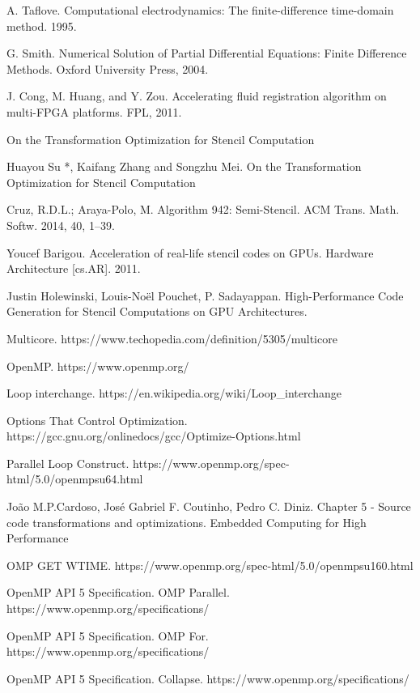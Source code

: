 \documentclass[conference]{IEEEtran}
\begin{document}
\begin{thebibliography}{1}

A. Taflove. Computational electrodynamics: The finite-difference time-domain method. 1995.

G. Smith. Numerical Solution of Partial Differential Equations: Finite Difference Methods. Oxford University Press, 2004.

J. Cong, M. Huang, and Y. Zou. Accelerating fluid registration algorithm on multi-FPGA platforms. FPL, 2011.

On the Transformation Optimization for Stencil Computation

Huayou Su *, Kaifang Zhang and Songzhu Mei. On the Transformation Optimization for Stencil Computation

Cruz, R.D.L.; Araya-Polo, M. Algorithm 942: Semi-Stencil. ACM Trans. Math. Softw. 2014, 40, 1–39.

Youcef Barigou. Acceleration of real-life stencil codes on GPUs. Hardware Architecture [cs.AR]. 2011.

Justin Holewinski, Louis-Noël Pouchet, P. Sadayappan. High-Performance Code Generation for Stencil Computations on GPU Architectures.

Multicore. https://www.techopedia.com/definition/5305/multicore

OpenMP. https://www.openmp.org/

Loop interchange. https://en.wikipedia.org/wiki/Loop_interchange

Options That Control Optimization. https://gcc.gnu.org/onlinedocs/gcc/Optimize-Options.html

Parallel Loop Construct. https://www.openmp.org/spec-html/5.0/openmpsu64.html

João M.P.Cardoso, José Gabriel F. Coutinho, Pedro C. Diniz. Chapter 5 - Source code transformations and optimizations. Embedded Computing for High Performance

OMP GET WTIME. https://www.openmp.org/spec-html/5.0/openmpsu160.html

OpenMP API 5 Specification. OMP Parallel. https://www.openmp.org/specifications/

OpenMP API 5 Specification. OMP For. https://www.openmp.org/specifications/

OpenMP API 5 Specification. Collapse. https://www.openmp.org/specifications/

\end{thebibliography}
\end{document}

